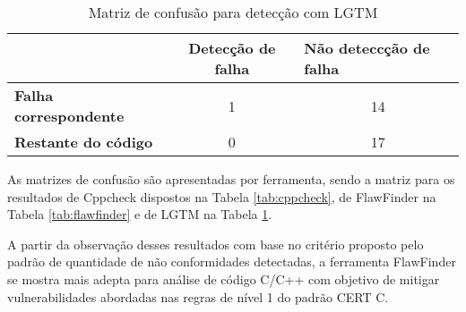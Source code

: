 \begin{table}[ht]
  \begin{tabular}{@{}lcc@{}}
  \toprule
                      & \textbf{Detecção de falha} & \multicolumn{1}{l}{\textbf{Não deteccção de falha}} \\ \midrule
  \textbf{Falha correspondente} & 1                        & 14                                               \\
  \textbf{Restante do código} & 0                        & 17                                               \\ \bottomrule
  \end{tabular}
  \caption{Matriz de confusão para detecção com LGTM}
  \label{tab:lgtm}
  \end{table}

As matrizes de confusão são apresentadas por ferramenta, sendo a matriz para os resultados de Cppcheck dispostos na Tabela \ref{tab:cppcheck}, de FlawFinder na Tabela \ref{tab:flawfinder} e de LGTM na Tabela \ref{tab:lgtm}.

A partir da observação desses resultados com base no critério proposto pelo padrão \cite{ccert} de quantidade de não conformidades detectadas, a ferramenta FlawFinder se mostra mais adepta para análise de código C/C++ com objetivo de mitigar vulnerabilidades abordadas nas regras de nível 1 do padrão CERT C.
